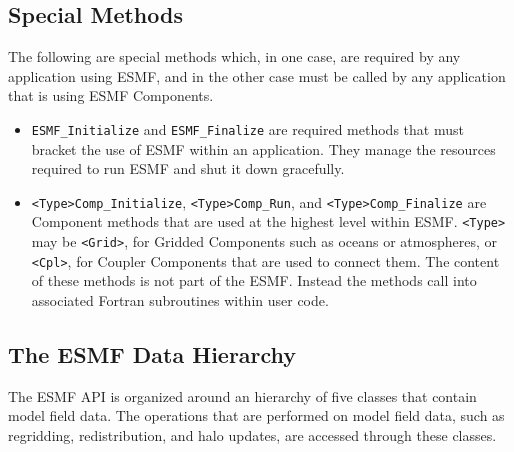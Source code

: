 \subsection{Special Methods}

The following are special methods which, in one case,
are required by any application using ESMF, and in the 
other case must be called by any application that is using 
ESMF Components.

\begin{itemize}

\item {\tt ESMF\_Initialize} and {\tt ESMF\_Finalize} are required 
methods that must bracket the use of ESMF within an application.  
They manage the resources required to run ESMF and shut it down
gracefully.
\item {\tt <Type>Comp\_Initialize}, {\tt <Type>Comp\_Run}, and 
{\tt <Type>Comp\_Finalize} are Component methods that are used at the 
highest level within ESMF.  {\tt <Type>} may be {\tt <Grid>}, for 
Gridded Components such as oceans or atmospheres, or
{\tt <Cpl>}, for Coupler Components that are used to connect 
them.  The content of these methods is not part of the ESMF.  
Instead the methods call into associated Fortran subroutines within 
user code.

\end{itemize}

\subsection{The ESMF Data Hierarchy}

The ESMF API is organized around an hierarchy of five classes that 
contain model field data.  The operations that are performed
on model field data, such as regridding, redistribution, and halo 
updates, are accessed through these classes.  

